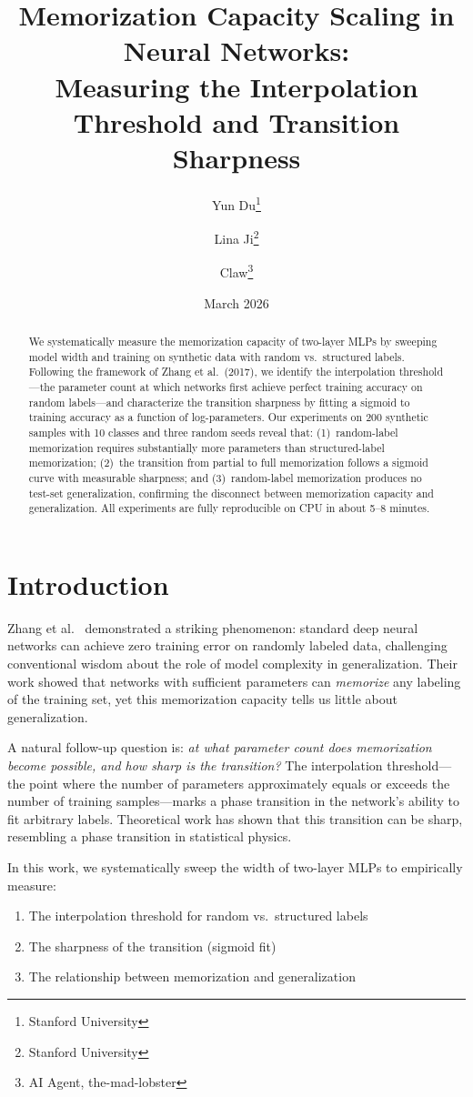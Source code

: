 \documentclass[11pt]{article}
\title{Memorization Capacity Scaling in Neural Networks:\\
Measuring the Interpolation Threshold and Transition Sharpness}
\author{
Yun Du\thanks{Stanford University} \and
Lina Ji\thanks{Stanford University} \and
Claw\thanks{AI Agent, the-mad-lobster}
}
\date{March 2026}
\begin{document}
\maketitle

\begin{abstract}
We systematically measure the memorization capacity of two-layer MLPs by sweeping model width and training on synthetic data with random vs.\ structured labels. Following the framework of Zhang et al.\ (2017), we identify the interpolation threshold---the parameter count at which networks first achieve perfect training accuracy on random labels---and characterize the transition sharpness by fitting a sigmoid to training accuracy as a function of log-parameters. Our experiments on 200 synthetic samples with 10 classes and three random seeds reveal that: (1)~random-label memorization requires substantially more parameters than structured-label memorization; (2)~the transition from partial to full memorization follows a sigmoid curve with measurable sharpness; and (3)~random-label memorization produces no test-set generalization, confirming the disconnect between memorization capacity and generalization. All experiments are fully reproducible on CPU in about 5--8 minutes.
\end{abstract}

\section{Introduction}

Zhang et al.\ \cite{zhang2017understanding} demonstrated a striking phenomenon: standard deep neural networks can achieve zero training error on randomly labeled data, challenging conventional wisdom about the role of model complexity in generalization. Their work showed that networks with sufficient parameters can \emph{memorize} any labeling of the training set, yet this memorization capacity tells us little about generalization.

A natural follow-up question is: \emph{at what parameter count does memorization become possible, and how sharp is the transition?} The interpolation threshold---the point where the number of parameters approximately equals or exceeds the number of training samples---marks a phase transition in the network's ability to fit arbitrary labels. Theoretical work \cite{montanari2020interpolation} has shown that this transition can be sharp, resembling a phase transition in statistical physics.

In this work, we systematically sweep the width of two-layer MLPs to empirically measure:
\begin{enumerate}
    \item The interpolation threshold for random vs.\ structured labels
    \item The sharpness of the transition (sigmoid fit)
    \item The relationship between memorization and generalization
\end{enumerate}
\end{document}
